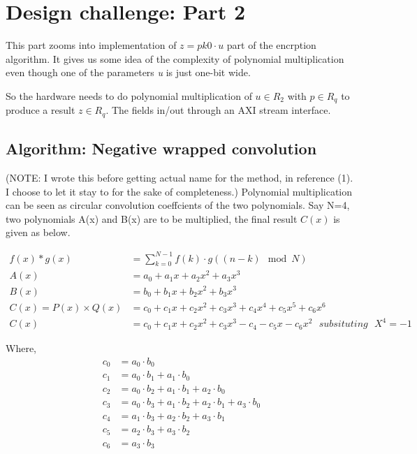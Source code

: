 \documentclass{article}
\begin{document}
    \section{Design challenge: Part 2}
    This part zooms into implementation of $z = pk0 \cdot u$ part of the encrption algorithm. It gives us some idea of the complexity of polynomial
    multiplication even though one of the parameters \textit{u} is just one-bit wide.

    So the hardware needs to do polynomial multiplication of $u \in R_2$ with  $p \in R_q$ to produce a result  $z \in R_q$.
    The fields in/out through an AXI stream interface. 

    \subsection{Algorithm: Negative wrapped convolution}\label{sec:NCC} 
    (NOTE: I wrote this before getting actual name for the method, in reference (1). I choose to let it stay to for the sake of completeness.)
    Polynomial multiplication can be seen as circular convolution coeffcients of the two polynomials. 
    Say N=4, two polynomials  A(x) and B(x) are to be multiplied, the final result $C(x)$ is given as below.

    \begin{align}
      f(x) \ast g(x) &= \sum_{k=0}^{N-1} f(k) \cdot g((n-k) \mod N) \\
      A(x) &= a_0 + a_1x + a_2x^2 + a_3x^3 \\
      B(x) &= b_0 + b_1x + b_2x^2 + b_3x^3 \\
      C(x) = P(x) \times Q(x) &= c_0 + c_1x + c_2x^2 + c_3x^3 + c_4x^4 + c_5x^5 + c_6x^6 \\
      C(x) &= c_0 + c_1x + c_2x^2 + c_3x^3 - c_4 - c_5x - c_6x^2\ \ \   subsituting\ \ \ X^4 = -1 
    \end{align}

    Where,
    \begin{align}
      c_0 &= a_0 \cdot b_0 \\
      c_1 &= a_0 \cdot b_1 + a_1 \cdot b_0 \\
      c_2 &= a_0 \cdot b_2 + a_1 \cdot b_1 + a_2 \cdot b_0 \\
      c_3 &= a_0 \cdot b_3 + a_1 \cdot b_2 + a_2 \cdot b_1 + a_3 \cdot b_0 \\
      c_4 &= a_1 \cdot b_3 + a_2 \cdot b_2 + a_3 \cdot b_1 \\
      c_5 &= a_2 \cdot b_3 + a_3 \cdot b_2 \\
      c_6 &= a_3 \cdot b_3 \\
    \end{align} 
    
\end{document}
